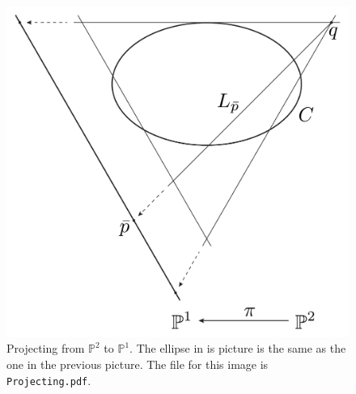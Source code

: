 \begin{figure}
\centering
\includegraphics[width=0.6\linewidth]{Projecting/Projecting}
\caption{Projecting from $ \mathbb{P}^{2} $ to $ \mathbb{P}^{1} $. The ellipse in is picture is the same as the one in the previous picture. The file for this image is \texttt{Projecting.pdf}.}
\label{fig:Projecting}
\end{figure}


 

